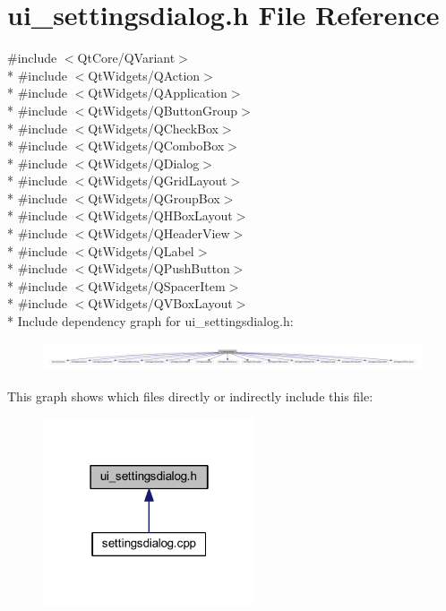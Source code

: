 \hypertarget{a00141}{\section{ui\+\_\+settingsdialog.\+h File Reference}
\label{a00141}
}
{\ttfamily \#include $<$Qt\+Core/\+Q\+Variant$>$}\\*
{\ttfamily \#include $<$Qt\+Widgets/\+Q\+Action$>$}\\*
{\ttfamily \#include $<$Qt\+Widgets/\+Q\+Application$>$}\\*
{\ttfamily \#include $<$Qt\+Widgets/\+Q\+Button\+Group$>$}\\*
{\ttfamily \#include $<$Qt\+Widgets/\+Q\+Check\+Box$>$}\\*
{\ttfamily \#include $<$Qt\+Widgets/\+Q\+Combo\+Box$>$}\\*
{\ttfamily \#include $<$Qt\+Widgets/\+Q\+Dialog$>$}\\*
{\ttfamily \#include $<$Qt\+Widgets/\+Q\+Grid\+Layout$>$}\\*
{\ttfamily \#include $<$Qt\+Widgets/\+Q\+Group\+Box$>$}\\*
{\ttfamily \#include $<$Qt\+Widgets/\+Q\+H\+Box\+Layout$>$}\\*
{\ttfamily \#include $<$Qt\+Widgets/\+Q\+Header\+View$>$}\\*
{\ttfamily \#include $<$Qt\+Widgets/\+Q\+Label$>$}\\*
{\ttfamily \#include $<$Qt\+Widgets/\+Q\+Push\+Button$>$}\\*
{\ttfamily \#include $<$Qt\+Widgets/\+Q\+Spacer\+Item$>$}\\*
{\ttfamily \#include $<$Qt\+Widgets/\+Q\+V\+Box\+Layout$>$}\\*
Include dependency graph for ui\+\_\+settingsdialog.\+h\+:
\nopagebreak
\begin{figure}[H]
\begin{center}
\leavevmode
\includegraphics[width=350pt]{d1/d05/a00423}
\end{center}
\end{figure}
This graph shows which files directly or indirectly include this file\+:
\nopagebreak
\begin{figure}[H]
\begin{center}
\leavevmode
\includegraphics[width=178pt]{dc/df3/a00424}
\end{center}
\end{figure}
